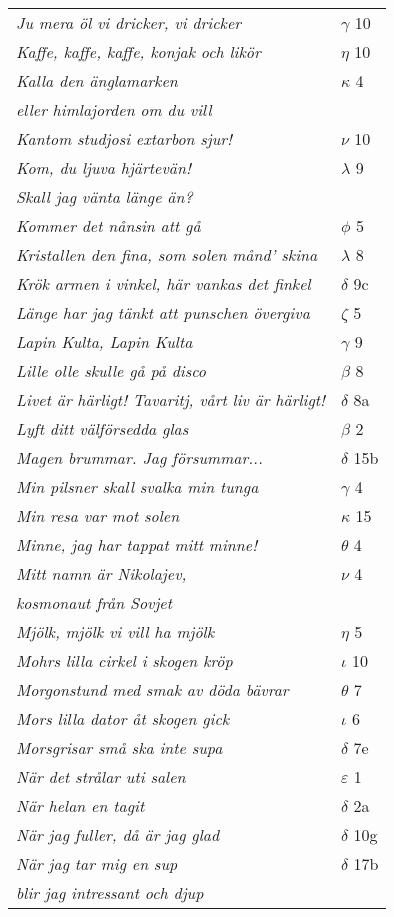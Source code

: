 \documentclass[a6paper,10pt]{article}
\begin{document}
\newpage
\begin{table}[!h]
\begin{tabular}{l l}
\textit{Ju mera öl vi dricker, vi dricker}	&$\gamma$ 10\\
\textit{Kaffe, kaffe, kaffe, konjak och likör}	&$\eta$ 10\\
\textit{Kalla den änglamarken}	&$\kappa$ 4\\
\textit{eller himlajorden om du vill} &\\
\textit{Kantom studjosi extarbon sjur!}	&$\nu$ 10\\
\textit{Kom, du ljuva hjärtevän!}	&$\lambda$ 9\\
\textit{Skall jag vänta länge än?} &\\
\textit{Kommer det nånsin att gå} &$\phi$ 5\\
\textit{Kristallen den fina, som solen månd' skina}	&$\lambda$ 8\\
\textit{Krök armen i vinkel, här vankas det finkel}	&$\delta$ 9c\\
\textit{Länge har jag tänkt att punschen övergiva}	&$\zeta$ 5\\
\textit{Lapin Kulta, Lapin Kulta}	&$\gamma$ 9\\
\textit{Lille olle skulle gå på disco}	&$\beta$ 8\\
\textit{Livet är härligt! Tavaritj, vårt liv är härligt!}	&$\delta$ 8a\\
\textit{Lyft ditt välförsedda glas}	&$\beta$ 2\\
\textit{Magen brummar. Jag försummar...}	&$\delta$ 15b\\
\textit{Min pilsner skall svalka min tunga}	&$\gamma$ 4\\
\textit{Min resa var mot solen} &$\kappa$ 15\\
\textit{Minne, jag har tappat mitt minne!}	&$\theta$ 4\\
\textit{Mitt namn är Nikolajev,}	&$\nu$ 4\\
\textit{kosmonaut från Sovjet} &\\
\textit{Mjölk, mjölk vi vill ha mjölk}	&$\eta$ 5\\
\textit{Mohrs lilla cirkel i skogen kröp}	&$\iota$ 10\\
\textit{Morgonstund med smak av döda bävrar}	&$\theta$ 7\\
\textit{Mors lilla dator åt skogen gick}	&$\iota$ 6\\
\textit{Morsgrisar små ska inte supa}	&$\delta$ 7e\\
\textit{När det strålar uti salen}	&$\varepsilon$ 1\\
\textit{När helan en tagit}	&$\delta$ 2a\\
\textit{När jag fuller, då är jag glad}	&$\delta$ 10g\\
\textit{När jag tar mig en sup}	&$\delta$ 17b\\
\textit{blir jag intressant och djup} &\\
\end{tabular}
\end{table}
\end{document}
